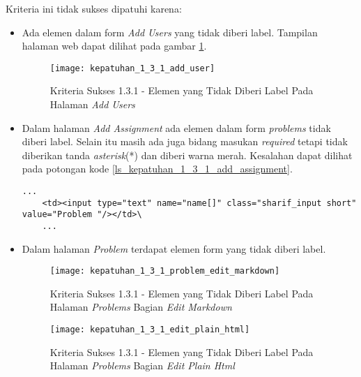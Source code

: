 Kriteria ini tidak sukses dipatuhi karena:
\begin{itemize}
	\item Ada elemen dalam form \textit{Add Users} yang tidak diberi label. Tampilan halaman web dapat dilihat pada gambar \ref{fig:kepatuhan_1_3_1_add_user}.
	\begin{figure}[H]
		\centering  
		\texttt{[image: kepatuhan\_1\_3\_1\_add\_user]}  
		\caption[Kriteria Sukses 1.3.1 - Elemen yang Tidak Diberi Label Pada Halaman \textit{Add Users}]{Kriteria Sukses 1.3.1 - Elemen yang Tidak Diberi Label Pada Halaman \textit{Add Users}} 
		\label{fig:kepatuhan_1_3_1_add_user} 
	\end{figure}
	\item Dalam halaman \textit{Add Assignment} ada elemen dalam form \textit{problems} tidak diberi label. Selain itu masih ada juga bidang masukan \textit{required} tetapi tidak diberikan tanda \textit{asterisk}(*) dan diberi warna merah. Kesalahan dapat dilihat pada potongan kode \ref{ls_kepatuhan_1_3_1_add_assignment}.
	\begin{lstlisting}[basicstyle=\ttfamily, frame=single,
	columns=fullflexible, keepspaces=true, breaklines=true, label=ls_kepatuhan_1_3_1_add_assignment, caption=Kriteria Sukses 1.3.1 - Elemen Dalam Form yang Tidak Diberi Label]
	...
	<td><input type="text" name="name[]" class="sharif_input short" value="Problem "/></td>\
	...
	\end{lstlisting}
	
	\item Dalam halaman \textit{Problem} terdapat elemen form yang tidak diberi label.
	\begin{figure}[H]
		\centering  
		\texttt{[image: kepatuhan\_1\_3\_1\_problem\_edit\_markdown]}  
		\caption[Kriteria Sukses 1.3.1 - Elemen yang Tidak Diberi Label Pada Halaman \textit{Problems} Bagian \textit{Edit Markdown}]{Kriteria Sukses 1.3.1 - Elemen yang Tidak Diberi Label Pada Halaman \textit{Problems} Bagian \textit{Edit Markdown}} 
		\label{fig:kepatuhan_1_3_1_problem_edit_markdown} 
	\end{figure}
	\begin{figure}[H]
		\centering  
		\texttt{[image: kepatuhan\_1\_3\_1\_edit\_plain\_html]}  
		\caption[Kriteria Sukses 1.3.1 - Elemen yang Tidak Diberi Label Pada Halaman \textit{Problems} Bagian \textit{Edit Plain Html}]{Kriteria Sukses 1.3.1 - Elemen yang Tidak Diberi Label Pada Halaman \textit{Problems} Bagian \textit{Edit Plain Html}} 
		\label{fig:kepatuhan_1_3_1_plain_html} 
	\end{figure}
\end{itemize}

